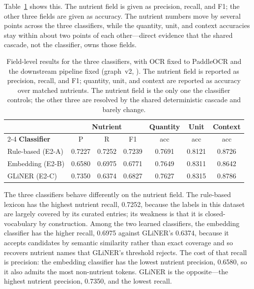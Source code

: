 Table~\ref{tab:classifier-fields} shows this. The nutrient field is given
as precision, recall, and F1; the other three fields are given as
accuracy. The nutrient numbers move by several points across the three
classifiers, while the quantity, unit, and context accuracies stay within
about two points of each other---direct evidence that the shared cascade,
not the classifier, owns those fields.

\begin{table}[htbp]
  \centering
  \caption[Classifier axis: field-level results]{Field-level results for
    the three classifiers, with OCR fixed to PaddleOCR and the downstream
    pipeline fixed (graph~v2, ). The nutrient field is
    reported as precision, recall, and F1; quantity, unit, and context
    are reported as accuracy over matched nutrients. The nutrient field is
    the only one the classifier controls; the other three are resolved by
    the shared deterministic cascade and barely change.}
  \label{tab:classifier-fields}
  \small
  \begin{tabular}{@{}lcccccc@{}}
    \toprule
     & \multicolumn{3}{c}{\textbf{Nutrient}} & \textbf{Quantity} & \textbf{Unit} & \textbf{Context} \\
    \cmidrule(lr){2-4}
    \textbf{Classifier} & P & R & F1 & acc & acc & acc \\
    \midrule
    Rule-based (E2-A) & 0.7227 & 0.7252 & 0.7239 & 0.7691 & 0.8121 & 0.8726 \\
    Embedding (E2-B)  & 0.6580 & 0.6975 & 0.6771 & 0.7649 & 0.8311 & 0.8642 \\
    GLiNER (E2-C)     & 0.7350 & 0.6374 & 0.6827 & 0.7627 & 0.8315 & 0.8786 \\
    \bottomrule
  \end{tabular}
\end{table}

The three classifiers behave differently on the nutrient field. The
rule-based lexicon has the highest nutrient recall, 0.7252, because the
labels in this dataset are largely covered by its curated entries; its
weakness is that it is closed-vocabulary by construction. Among the two
learned classifiers, the embedding classifier has the higher recall,
0.6975 against GLiNER's 0.6374, because it accepts candidates by semantic
similarity rather than exact coverage and so recovers nutrient names that
GLiNER's threshold rejects. The cost of that recall is precision: the
embedding classifier has the lowest nutrient precision, 0.6580, so it also
admits the most non-nutrient tokens. GLiNER is the opposite---the highest
nutrient precision, 0.7350, and the lowest recall.

